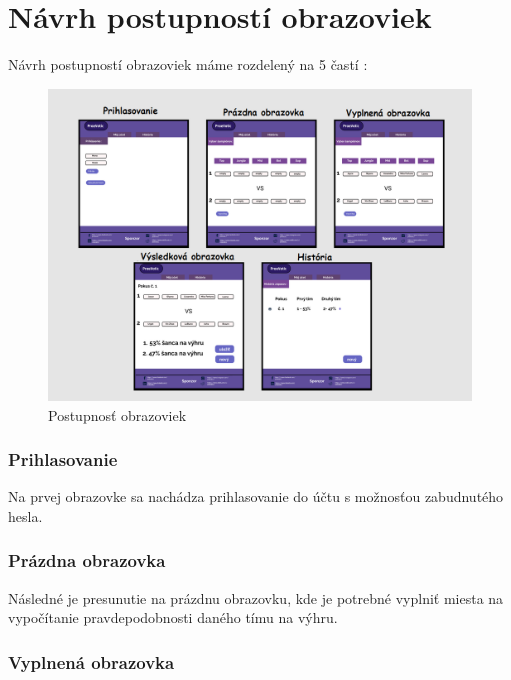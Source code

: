 \section*{Návrh postupností obrazoviek}

Návrh postupností obrazoviek máme rozdelený na 5 častí :



\begin{figure}[h!]
	
	\includegraphics[width=.9\textwidth]{figures/postupnost}
	
	\centering
	
	\caption{ Postupnosť obrazoviek \label{jednanula}}
	
\end{figure}



\subsubsection{Prihlasovanie}

Na prvej obrazovke sa nachádza prihlasovanie do účtu s možnosťou zabudnutého hesla.

\subsubsection{Prázdna obrazovka}

Následné je presunutie na prázdnu obrazovku, kde je potrebné vyplniť miesta na vypočítanie pravdepodobnosti daného tímu na výhru.

\subsubsection{Vyplnená obrazovka}


